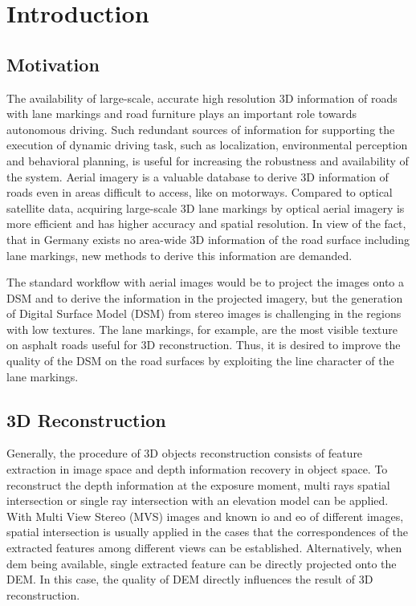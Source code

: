 
\chapter{Introduction}

\section{Motivation}
The availability of large-scale, accurate high resolution 3D information of roads with lane markings and road furniture plays an important role towards autonomous driving. Such redundant sources of information for supporting the execution of dynamic driving task, such as localization, environmental perception and behavioral planning, is useful for increasing the robustness and availability of the system. %
Aerial imagery is a valuable database to derive 3D information of roads even in areas difficult to access, like on motorways. Compared to optical satellite data, acquiring large-scale 3D lane markings by optical aerial imagery is more efficient and has higher accuracy and spatial resolution. In view of the fact, that in Germany exists no area-wide 3D information of the road surface including lane markings, new methods to derive this information are demanded.

The standard workflow with aerial images would be to project the images onto a DSM and to derive the information in the projected imagery, but the generation of Digital Surface Model (DSM) from stereo images is challenging in the regions with low textures. The lane markings, for example, are the most visible texture on asphalt roads useful for 3D reconstruction. Thus, it is desired to improve the quality of the DSM on the road surfaces by exploiting the line character of the lane markings. 




\section{3D Reconstruction}

Generally, the procedure of 3D objects reconstruction consists of feature extraction in image space and depth information recovery in object space. 
To reconstruct the depth information at the exposure moment, multi rays spatial intersection or single ray intersection with an elevation model can be applied.
With Multi View Stereo (MVS) images and known \gls{io} and \gls{eo} of different images, spatial intersection is usually applied in the cases that the correspondences of the extracted features among different views can be established.
Alternatively, when \gls{dem} being available, single extracted feature can be directly projected onto the DEM. In this case, the quality of DEM directly influences the result of 3D reconstruction. 

